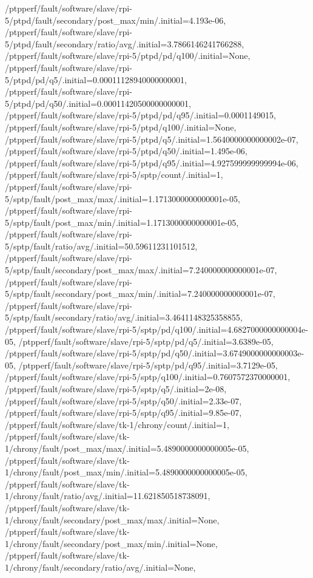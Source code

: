 {    /ptpperf/fault/software/slave/rpi-5/ptpd/fault/secondary/post_max/min/.initial=4.193e-06,
    /ptpperf/fault/software/slave/rpi-5/ptpd/fault/secondary/ratio/avg/.initial=3.7866146241766288,
    /ptpperf/fault/software/slave/rpi-5/ptpd/pd/q100/.initial=None,
    /ptpperf/fault/software/slave/rpi-5/ptpd/pd/q5/.initial=0.00011128940000000001,
    /ptpperf/fault/software/slave/rpi-5/ptpd/pd/q50/.initial=0.00011420500000000001,
    /ptpperf/fault/software/slave/rpi-5/ptpd/pd/q95/.initial=0.0001149015,
    /ptpperf/fault/software/slave/rpi-5/ptpd/q100/.initial=None,
    /ptpperf/fault/software/slave/rpi-5/ptpd/q5/.initial=1.5640000000000002e-07,
    /ptpperf/fault/software/slave/rpi-5/ptpd/q50/.initial=1.495e-06,
    /ptpperf/fault/software/slave/rpi-5/ptpd/q95/.initial=4.927599999999994e-06,
    /ptpperf/fault/software/slave/rpi-5/sptp/count/.initial=1,
    /ptpperf/fault/software/slave/rpi-5/sptp/fault/post_max/max/.initial=1.1713000000000001e-05,
    /ptpperf/fault/software/slave/rpi-5/sptp/fault/post_max/min/.initial=1.1713000000000001e-05,
    /ptpperf/fault/software/slave/rpi-5/sptp/fault/ratio/avg/.initial=50.59611231101512,
    /ptpperf/fault/software/slave/rpi-5/sptp/fault/secondary/post_max/max/.initial=7.240000000000001e-07,
    /ptpperf/fault/software/slave/rpi-5/sptp/fault/secondary/post_max/min/.initial=7.240000000000001e-07,
    /ptpperf/fault/software/slave/rpi-5/sptp/fault/secondary/ratio/avg/.initial=3.4641148325358855,
    /ptpperf/fault/software/slave/rpi-5/sptp/pd/q100/.initial=4.6827000000000004e-05,
    /ptpperf/fault/software/slave/rpi-5/sptp/pd/q5/.initial=3.6389e-05,
    /ptpperf/fault/software/slave/rpi-5/sptp/pd/q50/.initial=3.6749000000000003e-05,
    /ptpperf/fault/software/slave/rpi-5/sptp/pd/q95/.initial=3.7129e-05,
    /ptpperf/fault/software/slave/rpi-5/sptp/q100/.initial=0.7607572370000001,
    /ptpperf/fault/software/slave/rpi-5/sptp/q5/.initial=2e-08,
    /ptpperf/fault/software/slave/rpi-5/sptp/q50/.initial=2.33e-07,
    /ptpperf/fault/software/slave/rpi-5/sptp/q95/.initial=9.85e-07,
    /ptpperf/fault/software/slave/tk-1/chrony/count/.initial=1,
    /ptpperf/fault/software/slave/tk-1/chrony/fault/post_max/max/.initial=5.4890000000000005e-05,
    /ptpperf/fault/software/slave/tk-1/chrony/fault/post_max/min/.initial=5.4890000000000005e-05,
    /ptpperf/fault/software/slave/tk-1/chrony/fault/ratio/avg/.initial=11.621850518738091,
    /ptpperf/fault/software/slave/tk-1/chrony/fault/secondary/post_max/max/.initial=None,
    /ptpperf/fault/software/slave/tk-1/chrony/fault/secondary/post_max/min/.initial=None,
    /ptpperf/fault/software/slave/tk-1/chrony/fault/secondary/ratio/avg/.initial=None,
}
